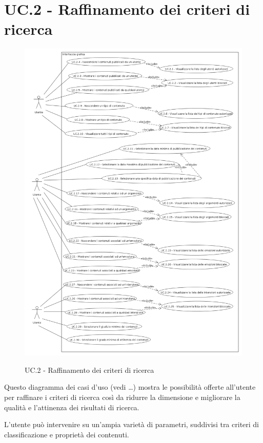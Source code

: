 \documentclass[10pt,a4paper,headinclude,footinclude,hidelinks]{scrreprt} %
\begin{document}
	\section{UC.2 - Raffinamento dei criteri di ricerca}
	\label{ch:stage:ar:uc:2}

	\begin{figure}[]
		\begin{center}
	    	\includegraphics[width=12cm]{uc_2.png}
			\label{gfx:uc:2}
			\caption{UC.2 - Raffinamento dei criteri di ricerca}
		\end{center}
	\end{figure}

	Questo diagramma dei casi d'uso (vedi \ldots) mostra le possibilità offerte all'utente per raffinare i criteri di ricerca così da ridurre la dimensione e migliorare la qualità e l'attinenza dei risultati di ricerca.

	L'utente può intervenire su un'ampia varietà di parametri, suddivisi tra criteri di classificazione e proprietà dei contenuti.
\end{document}
